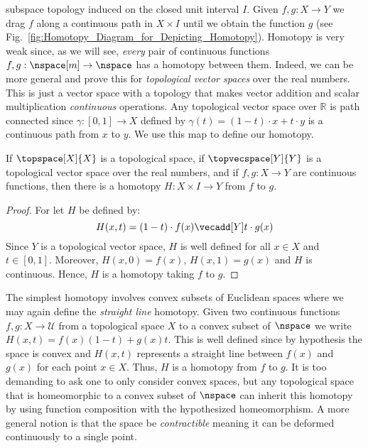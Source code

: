         subspace topology induced on the closed unit interval $I$. Given
        $f,g:X\rightarrow{Y}$ we drag $f$ along a continuous path in
        $X\times{I}$ until we obtain the function $g$
        (see Fig.~\ref{fig:Homotopy_Diagram_for_Depicting_Homotopy}).
        Homotopy is very weak since, as we will see, \textit{every} pair
        of continuous functions $f,g:\nspace[m]\rightarrow\nspace$ has a
        homotopy between them. Indeed, we can be more general and
        prove this for \textit{topological vector spaces} over the real
        numbers. This is just a vector space with a topology that makes
        vector addition and scalar multiplication \textit{continuous}
        operations. Any topological vector space over $\mathbb{R}$ is
        path connected since $\gamma:[0,1]\rightarrow{X}$ defined by
        $\gamma(t)=(1-t)\cdot{x}+t\cdot{y}$ is a continuous path from
        $x$ to $y$. We use this map to define our homotopy.
        \begin{theorem}
            If $\topspace[X]{X}$ is a topological space, if
            $\topvecspace[Y]{Y}$ is a topological vector space over the
            real numbers, and if $f,g:X\rightarrow{Y}$ are continuous
            functions, then there is a homotopy
            $H:X\times{I}\rightarrow{Y}$ from $f$ to $g$.
        \end{theorem}
        \begin{proof}
            For let $H$ be defined by:
            \begin{equation}
                \label{eqn:Straight_Line_Homotopy}%
                H(x,t)=(1-t)\cdot{f}(x)\vecadd[Y]t\cdot{g}(x)
            \end{equation}
            Since $Y$ is a topological vector space, $H$ is well defined
            for all $x\in{X}$ and $t\in[0,1]$. Moreover, $H(x,0)=f(x)$,
            $H(x,1)=g(x)$ and $H$ is continuous. Hence, $H$ is a
            homotopy taking $f$ to $g$.
        \end{proof}
        \begin{example}
            \label{ex:Straight_Line_Homotopy_Euc_Spaces}%
            The simplest homotopy involves convex subsets of Euclidean
            spaces where we may again define the \textit{straight line}
            homotopy. Given two continuous functions
            $f,g:X\rightarrow\mathcal{U}$ from a topological space $X$
            to a convex subset of $\nspace$ we write
            $H(x,t)=f(x)(1-t)+g(x)t$. This is well defined since by
            hypothesis the space is convex and $H(x,t)$ represents a
            straight line between $f(x)$ and $g(x)$ for each point
            $x\in{X}$. Thus, $H$ is a homotopy from $f$ to $g$. It is
            too demanding to ask one to only consider convex spaces, but
            any topological space that is homeomorphic to a convex
            subset of $\nspace$ can inherit this homotopy by using
            function composition with the hypothesized homeomorphism. A
            more general notion is that the space be
            \textit{contractible} meaning it can be deformed
            continuously to a single point.
        \end{example}
